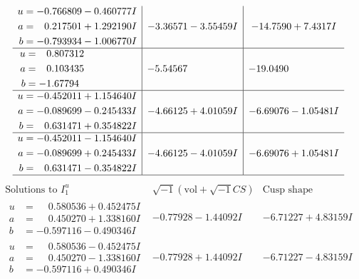 \documentclass[1p]{elsarticle_modified}
\theoremstyle{definition}
\newcommand{\I}{\sqrt{-1}}
\begin{document}
$$\begin{array}{c|c|c}
\begin{aligned}
u &= -0.766809 - 0.460777 I \\
a &= \phantom{-}0.217501 + 1.292190 I \\
b &= -0.793934 - 1.006770 I\end{aligned}
 & -3.36571 - 3.55459 I & -14.7590 + 7.4317 I \\ \hline\begin{aligned}
u &= \phantom{-}0.807312\phantom{ +0.000000I} \\
a &= \phantom{-}0.103435\phantom{ +0.000000I} \\
b &= -1.67794\phantom{ +0.000000I}\end{aligned}
 & -5.54567\phantom{ +0.000000I} & -19.0490\phantom{ +0.000000I} \\ \hline\begin{aligned}
u &= -0.452011 + 1.154640 I \\
a &= -0.089699 - 0.245433 I \\
b &= \phantom{-}0.631471 + 0.354822 I\end{aligned}
 & -4.66125 + 4.01059 I & -6.69076 - 1.05481 I \\ \hline\begin{aligned}
u &= -0.452011 - 1.154640 I \\
a &= -0.089699 + 0.245433 I \\
b &= \phantom{-}0.631471 - 0.354822 I\end{aligned}
 & -4.66125 - 4.01059 I & -6.69076 + 1.05481 I\\
 \hline 
 \end{array}$$\newpage$$\begin{array}{c|c|c}  
\text{Solutions to }I^u_{1}& \I (\text{vol} + \sqrt{-1}CS) & \text{Cusp shape}\\
 \hline 
\begin{aligned}
u &= \phantom{-}0.580536 + 0.452475 I \\
a &= \phantom{-}0.450270 + 1.338160 I \\
b &= -0.597116 - 0.490346 I\end{aligned}
 & -0.77928 - 1.44092 I & -6.71227 + 4.83159 I \\ \hline\begin{aligned}
u &= \phantom{-}0.580536 - 0.452475 I \\
a &= \phantom{-}0.450270 - 1.338160 I \\
b &= -0.597116 + 0.490346 I\end{aligned}
 & -0.77928 + 1.44092 I & -6.71227 - 4.83159 I \\ \hline\begin{aligned}

\end{aligned}
\end{array}$$
\end{document}

